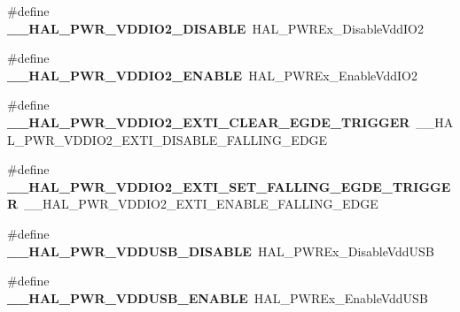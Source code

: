 \begin{DoxyCompactItemize}
\item 
\mbox{\label{group___h_a_l___p_w_r___aliased___macros_ga61f85ad4cd0958d67c8cf027a1b67da5}} 
\#define {\bfseries \+\_\+\+\_\+\+H\+A\+L\+\_\+\+P\+W\+R\+\_\+\+V\+D\+D\+I\+O2\+\_\+\+D\+I\+S\+A\+B\+LE}~H\+A\+L\+\_\+\+P\+W\+R\+Ex\+\_\+\+Disable\+Vdd\+I\+O2
\item 
\mbox{\label{group___h_a_l___p_w_r___aliased___macros_ga0dabc2d8d35163d52c02fcbd04fd14a6}} 
\#define {\bfseries \+\_\+\+\_\+\+H\+A\+L\+\_\+\+P\+W\+R\+\_\+\+V\+D\+D\+I\+O2\+\_\+\+E\+N\+A\+B\+LE}~H\+A\+L\+\_\+\+P\+W\+R\+Ex\+\_\+\+Enable\+Vdd\+I\+O2
\item 
\mbox{\label{group___h_a_l___p_w_r___aliased___macros_ga93b3f07014857ba319c24a7e3e8b7ed0}} 
\#define {\bfseries \+\_\+\+\_\+\+H\+A\+L\+\_\+\+P\+W\+R\+\_\+\+V\+D\+D\+I\+O2\+\_\+\+E\+X\+T\+I\+\_\+\+C\+L\+E\+A\+R\+\_\+\+E\+G\+D\+E\+\_\+\+T\+R\+I\+G\+G\+ER}~\+\_\+\+\_\+\+H\+A\+L\+\_\+\+P\+W\+R\+\_\+\+V\+D\+D\+I\+O2\+\_\+\+E\+X\+T\+I\+\_\+\+D\+I\+S\+A\+B\+L\+E\+\_\+\+F\+A\+L\+L\+I\+N\+G\+\_\+\+E\+D\+GE
\item 
\mbox{\label{group___h_a_l___p_w_r___aliased___macros_gab5cb9dc5b115d7af7a361bf073af54b4}} 
\#define {\bfseries \+\_\+\+\_\+\+H\+A\+L\+\_\+\+P\+W\+R\+\_\+\+V\+D\+D\+I\+O2\+\_\+\+E\+X\+T\+I\+\_\+\+S\+E\+T\+\_\+\+F\+A\+L\+L\+I\+N\+G\+\_\+\+E\+G\+D\+E\+\_\+\+T\+R\+I\+G\+G\+ER}~\+\_\+\+\_\+\+H\+A\+L\+\_\+\+P\+W\+R\+\_\+\+V\+D\+D\+I\+O2\+\_\+\+E\+X\+T\+I\+\_\+\+E\+N\+A\+B\+L\+E\+\_\+\+F\+A\+L\+L\+I\+N\+G\+\_\+\+E\+D\+GE
\item 
\mbox{\label{group___h_a_l___p_w_r___aliased___macros_ga203b7ebde33c1eb9c99f0ac45fa521e7}} 
\#define {\bfseries \+\_\+\+\_\+\+H\+A\+L\+\_\+\+P\+W\+R\+\_\+\+V\+D\+D\+U\+S\+B\+\_\+\+D\+I\+S\+A\+B\+LE}~H\+A\+L\+\_\+\+P\+W\+R\+Ex\+\_\+\+Disable\+Vdd\+U\+SB
\item 
\mbox{\label{group___h_a_l___p_w_r___aliased___macros_ga56a0796742be5992269988f4509011fe}} 
\#define {\bfseries \+\_\+\+\_\+\+H\+A\+L\+\_\+\+P\+W\+R\+\_\+\+V\+D\+D\+U\+S\+B\+\_\+\+E\+N\+A\+B\+LE}~H\+A\+L\+\_\+\+P\+W\+R\+Ex\+\_\+\+Enable\+Vdd\+U\+SB

\end{DoxyCompactItemize}
